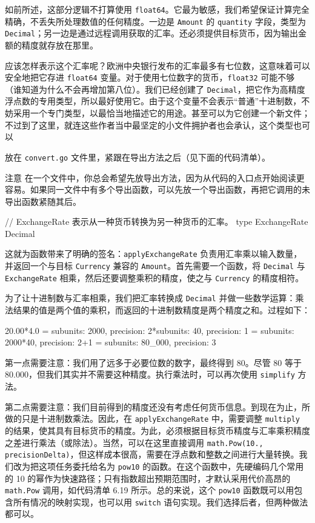 如前所述，这部分逻辑不打算使用 \texttt{float64}。它最为敏感，我们希望保证计算完全精确，不丢失所处理数值的任何精度。一边是 \texttt{Amount} 的 \texttt{quantity} 字段，类型为 \texttt{Decimal}；另一边是通过远程调用获取的汇率。还必须提供目标货币，因为输出金额的精度就存放在那里。

应该怎样表示这个汇率呢？欧洲中央银行发布的汇率最多有七位数，这意味着可以安全地把它存进 \texttt{float64} 变量。对于使用七位数字的货币，\texttt{float32} 可能不够（谁知道为什么不会再增加第八位）。我们已经创建了 \texttt{Decimal}，把它作为高精度浮点数的专用类型，所以最好使用它。由于这个变量不会表示“普通”十进制数，不妨采用一个专门类型，以最恰当地描述它的用途。甚至可以为它创建一个新文件；不过到了这里，就连这些作者当中最坚定的小文件拥护者也会承认，这个类型也可以

放在 \texttt{convert.go} 文件里，紧跟在导出方法之后（见下面的代码清单）。

\begin{infobox}{注意}
在一个文件中，你总会希望先放导出方法，因为从代码的入口点开始阅读更容易。如果同一文件中有多个导出函数，可以先放一个导出函数，再把它调用的未导出函数紧随其后。
\end{infobox}

\begin{gocode}[title={代码清单 6.18 \texttt{convert.go}：\texttt{ExchangeRate} 类型}]
// ExchangeRate 表示从一种货币转换为另一种货币的汇率。
type ExchangeRate Decimal
\end{gocode}

这就为函数带来了明确的签名：\texttt{applyExchangeRate} 负责用汇率乘以输入数量，并返回一个与目标 \texttt{Currency} 兼容的 \texttt{Amount}。首先需要一个函数，将 \texttt{Decimal} 与 \texttt{ExchangeRate} 相乘，然后还要调整乘积的精度，使之与 \texttt{Currency} 的精度相符。

为了让十进制数与汇率相乘，我们把汇率转换成 \texttt{Decimal} 并做一些数学运算：乘法结果的值是两个值的乘积，而返回的十进制数精度是两个精度之和。过程如下：

\begin{gocode}[]
20.00*4.0 = {subunits: 2000, precision: 2}*{subunits: 40, precision: 1}
          = {subunits: 2000*40, precision: 2+1}
          = {subunits: 80_000, precision: 3}
\end{gocode}

第一点需要注意：我们用了远多于必要位数的数字，最终得到 80。尽管 80 等于 80.000，但我们其实并不需要这种精度。执行乘法时，可以再次使用 \texttt{simplify} 方法。

第二点需要注意：我们目前得到的精度还没有考虑任何货币信息。到现在为止，所做的只是十进制数乘法。因此，在 \texttt{applyExchangeRate} 中，需要调整 \texttt{multiply} 的结果，使其具有目标货币的精度。为此，必须根据目标货币精度与汇率乘积精度之差进行乘法（或除法）。当然，可以在这里直接调用 \texttt{math.Pow(10., precisionDelta)}，但这样成本很高，需要在浮点数和整数之间进行大量转换。我们改为把这项任务委托给名为 \texttt{pow10} 的函数。在这个函数中，先硬编码几个常用的 10 的幂作为快速路径；只有指数超出预期范围时，才默认采用代价高昂的 \texttt{math.Pow} 调用，如代码清单 6.19 所示。总的来说，这个 \texttt{pow10} 函数既可以用包含所有情况的映射实现，也可以用 \texttt{switch} 语句实现。我们选择后者，但两种做法都可以。

